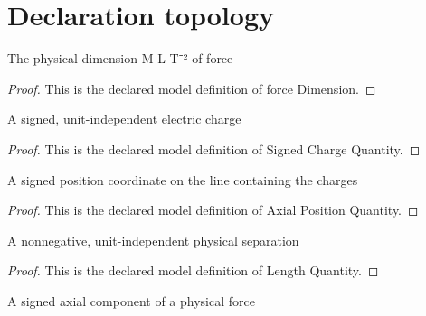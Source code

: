 \section{Declaration topology}
\begin{definition}
  \label{def:physics:phyx-mini-0892:phyxminiproblems-problemphyxmini0892-forcedimension}
  The physical dimension M L T⁻² of force
\end{definition}
\begin{proof}
  This is the declared model definition of force Dimension.
\end{proof}
\begin{definition}
  \label{def:physics:phyx-mini-0892:phyxminiproblems-problemphyxmini0892-signedchargequantity}
  A signed, unit-independent electric charge
\end{definition}
\begin{proof}
  This is the declared model definition of Signed Charge Quantity.
\end{proof}
\begin{definition}
  \label{def:physics:phyx-mini-0892:phyxminiproblems-problemphyxmini0892-axialpositionquantity}
  A signed position coordinate on the line containing the charges
\end{definition}
\begin{proof}
  This is the declared model definition of Axial Position Quantity.
\end{proof}
\begin{definition}
  \label{def:physics:phyx-mini-0892:phyxminiproblems-problemphyxmini0892-lengthquantity}
  A nonnegative, unit-independent physical separation
\end{definition}
\begin{proof}
  This is the declared model definition of Length Quantity.
\end{proof}
\begin{definition}
  \label{def:physics:phyx-mini-0892:phyxminiproblems-problemphyxmini0892-axialforcecomponentquantity}
  A signed axial component of a physical force
\end{definition}
